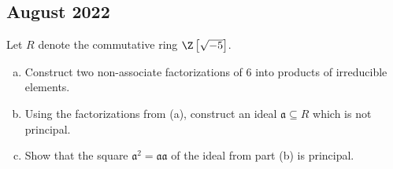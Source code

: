\documentclass[10pt]{mypackage}
\begin{document}
\subsection{August 2022}%
\begin{problem}[Problem 1]
  Let $R$ denote the commutative ring $\Z\left[ \sqrt{-5} \right]$.
  \begin{enumerate}[(a)]
    \item Construct two non-associate factorizations of $6$ into products of irreducible elements.
    \item Using the factorizations from (a), construct an ideal $ \mathfrak{a}\subseteq R $ which is not principal.
    \item Show that the square $ \mathfrak{a}^2 = \mathfrak{a} \mathfrak{a} $ of the ideal from part (b) is principal.
  \end{enumerate}
\end{problem}
\end{document}
